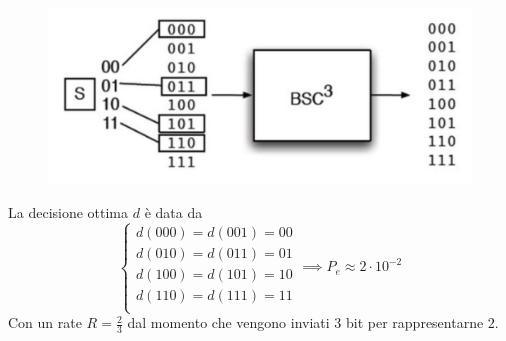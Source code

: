  \begin{minipage}{0.45\textwidth}
 \begin{figure}[H]
     \centering
     \includegraphics[scale=0.2]{img/bsc3.jpg}
 \end{figure}
 \end{minipage} \hfill
 \begin{minipage}{0.45\textwidth}
 La decisione ottima $d$ \`e data da
\begin{equation*}
    \begin{cases}
    d(000) = d(001) = 00 \\
    d(010) = d(011) = 01 \\
    d(100) = d(101) = 10 \\
    d(110) = d(111) = 11 \\
    \end{cases} \implies P_e \approx 2 \cdot 10^{-2}
\end{equation*}
Con un rate $R=\frac{2}{3}$ dal momento che vengono inviati $3$ bit per rappresentarne $2$.
\end{minipage}


